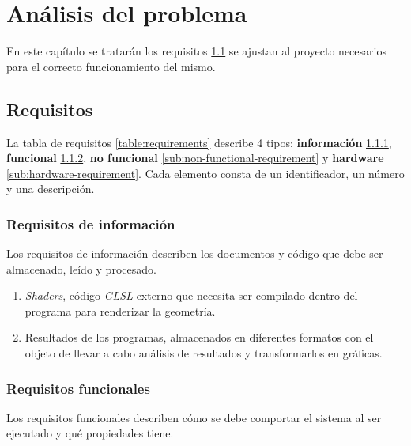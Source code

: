 \chapter{Análisis del problema}\label{chp:analysis}

En este capítulo se tratarán los requisitos \ref{sec:requirements} se ajustan al proyecto necesarios para el correcto funcionamiento del mismo.

\section{Requisitos}\label{sec:requirements}
La tabla de requisitos \ref{table:requirements} describe 4 tipos: \textbf{información} \ref{sub:information-requirement}, \textbf{funcional} \ref{sub:functional-requirement}, \textbf{no funcional} \ref{sub:non-functional-requirement} y \textbf{hardware} \ref{sub:hardware-requirement}. Cada elemento consta de un identificador, un número y una descripción.


\subsection{Requisitos de información}\label{sub:information-requirement}
Los requisitos de información describen los documentos y código que debe ser almacenado, leído y procesado.

\begin{enumerate}

    \item \textit{Shaders}, código \textit{GLSL} externo que necesita ser compilado dentro del programa para renderizar la geometría.

    \item Resultados de los programas, almacenados en diferentes formatos con el objeto de llevar a cabo análisis de resultados y transformarlos en gráficas.
    
\end{enumerate}

\subsection{Requisitos funcionales}\label{sub:functional-requirement}
Los requisitos funcionales describen cómo se debe comportar el sistema al ser ejecutado y qué propiedades tiene.


